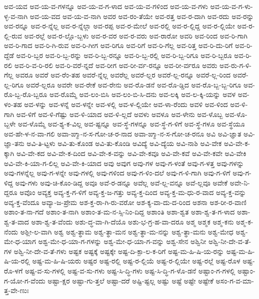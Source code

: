 {ಅವ-ಯವ
ಅವ-ಯ-ವ-ಗಳನ್ನೂ
ಅವ-ಯ-ವ-ಗ-ಳಾದ
ಅವ-ಯ-ವ-ಗಳಿಂದ
ಅವ-ಯ-ವ-ಗಳು
ಅವ-ಯ-ವ-ಗ-ಳು-ಳ್ಳ-ವ-ನಾಗಿ
ಅವ-ಯ-ವದ
ಅವ-ಯ-ವ-ನಾಗಿ
ಅವರ
ಅವ-ರಂ-ತೆಯೇ
ಅವ-ರತ್ತ
ಅವ-ರ-ದಾಗಿ
ಅವ-ರದು
ಅವ-ರನ್ನು
ಅವ-ರನ್ನೂ
ಅವ-ರ-ನ್ನೆಲ್ಲ
ಅವ-ರ-ನ್ನೆಲ್ಲಾ
ಅವ-ರಪ್ಪ
ಅವ-ರ-ಮೇಲೆ
ಅವ-ರಲ್ಲಿ
ಅವ-ರ-ಲ್ಲಿದ್ದ
ಅವ-ರ-ಲ್ಲಿಯೇ
ಅವ-ರ-ಲ್ಲಿ-ರುವ
ಅವ-ರಲ್ಲೆ
ಅವ-ರ-ಲ್ಲೊ-ಬ್ಬಳು
ಅವ-ರ-ವರ
ಅವ-ರ-ವರು
ಅವ-ರಾರೋ
ಅವರಿ
ಅವ-ರಿಂದ
ಅವ-ರಿ-ಗಾಗಿ
ಅವ-ರಿ-ಗಾದ
ಅವ-ರಿ-ಗಿ-ರುವ
ಅವ-ರಿ-ಗೀಗ
ಅವ-ರಿಗೂ
ಅವ-ರಿಗೆ
ಅವ-ರಿ-ಗೆಲ್ಲ
ಅವ-ರಿತ್ತ
ಅವ-ರಿ-ದು-ರಿಗೆ
ಅವ-ರಿ-ದ್ದೆಡೆ
ಅವ-ರಿ-ಬ್ಬರ
ಅವ-ರಿ-ಬ್ಬ-ರನ್ನು
ಅವ-ರಿ-ಬ್ಬ-ರನ್ನೂ
ಅವ-ರಿ-ಬ್ಬ-ರಲ್ಲಿ
ಅವ-ರಿ-ಬ್ಬ-ರಿಗೂ
ಅವ-ರಿ-ಬ್ಬರೂ
ಅವ-ರಿ-ರಲಿ
ಅವ-ರಿ-ವ-ರಿ-ರಲಿ
ಅವ-ರಿ-ವರೆ-ನ್ನದೆ
ಅವ-ರೀಗ
ಅವ-ರೀ-ರ್ವ-ರನ್ನೂ
ಅವ-ರೀ-ರ್ವರೂ
ಅವರು
ಅವ-ರು-ಗ-ಳಿ-ಗೆಲ್ಲ
ಅವರೂ
ಅವರೆ
ಅವ-ರೆಂ-ತಹ
ಅವರೆ-ನ್ನೆಲ್ಲ
ಅವರೆಲ್ಲ
ಅವರೆ-ಲ್ಲರ
ಅವರೆ-ಲ್ಲ-ರನ್ನೂ
ಅವರೆ-ಲ್ಲ-ರಿಂದ
ಅವರೆ-ಲ್ಲ-ರಿಗೂ
ಅವರೆ-ಲ್ಲರೂ
ಅವರೇ
ಅವ-ರೇಕೆ
ಅವ-ರೇನು
ಅವ-ರೊ-ಡನೆ
ಅವ-ರೊ-ಡ್ಡಿದ
ಅವ-ರೊ-ಬ್ಬ-ಬ್ಬ-ರಿಗೂ
ಅವ-ರೊ-ಬ್ಬ-ರೊ-ಬ್ಬರೂ
ಅವ-ರೊಮ್ಮೆ
ಅವ-ಲಂ-ಬಿಸಿ
ಅವ-ಲಂ-ಬಿ-ಸಿ-ದನು
ಅವ-ಲಕ್ಕಿ
ಅವ-ಲ-ಕ್ಕಿ-ಯನ್ನು
ಅವಳ
ಅವ-ಳಂ-ತಹ
ಅವ-ಳನ್ನು
ಅವ-ಳನ್ನೆ
ಅವ-ಳನ್ನೇ
ಅವ-ಳಲ್ಲಿ
ಅವ-ಳ-ಲ್ಲಿಯೇ
ಅವ-ಳಾ-ರೆಂದು
ಅವಳಿ
ಅವ-ಳಿಂದ
ಅವ-ಳಿ-ಗಾಗಿ
ಅವ-ಳಿಗೆ
ಅವ-ಳಿ-ಗೆಷ್ಟು
ಅವ-ಳಿ-ಯಾದ
ಅವ-ಳಿ-ಲ್ಲದೆ
ಅವಳು
ಅವಳೂ
ಅವ-ಳೇನು
ಅವ-ಳೊಬ್ಬ
ಅವ-ಳೊ-ಬ್ಬಳೇ
ಅವ-ಳೊಮ್ಮೆ
ಅವ-ಶ್ಯ-ಕ-ವಿಲ್ಲ
ಅವ-ಷ್ಟನ್ನೂ
ಅವ-ಸ್ಥೆ-ಗಳನ್ನೂ
ಅವ-ಸ್ಥೆ-ಗ-ಳಿಗೆ
ಅವ-ಸ್ಥೆ-ಗಳೂ
ಅವ-ಸ್ಥೆಯೂ
ಅವ-ಹೇ-ಳ-ನ-ವಾ-ಗಲಿ
ಅವಾ-ಙ್ಮಾ-ನ-ಸ-ಗೋ-ಚ-ರ-ನಾದ
ಅವಾ-ಙ್ಮಾ-ನ-ಸ-ಗೋ-ಚ-ರನೂ
ಅವಿ
ಅವಿ-ಜ್ಞಾತ
ಅವಿ-ಜ್ಞಾ-ತನು
ಅವಿ-ತಿ-ಟ್ಟಳು
ಅವಿ-ತು-ಕೊಂಡ
ಅವಿ-ತು-ಕೊಂಡಿ
ಅವಿದ್ಯೆ
ಅವಿ-ದ್ಯೆಯ
ಅವಿ-ನಾಶಿ
ಅವಿ-ವೇಕ
ಅವಿ-ವೇ-ಕ-ಕ್ಕಾಗಿ
ಅವಿ-ವೇ-ಕದ
ಅವಿ-ವೇ-ಕ-ದಿಂದ
ಅವಿ-ವೇ-ಕ-ವನ್ನು
ಅವಿ-ವೇ-ಕವೂ
ಅವಿ-ವೇ-ಕವೆ
ಅವಿ-ವೇ-ಕವೇ
ಅವಿ-ವೇಕಿ
ಅವಿ-ವೇ-ಕಿ-ಯಾ-ಗ-ಲಿಲ್ಲ
ಅವಿ-ವೇ-ಕಿ-ಯಾದ
ಅವು
ಅವುಗ
ಅವು-ಗಳ
ಅವು-ಗ-ಳಂತೆ
ಅವು-ಗ-ಳತ್ತ
ಅವು-ಗಳನ್ನು
ಅವು-ಗಳನ್ನೆಲ್ಲ
ಅವು-ಗ-ಳನ್ನೇ
ಅವು-ಗಳಲ್ಲಿ
ಅವು-ಗಳಿಂದ
ಅವು-ಗ-ಳಿಂ-ದಲೆ
ಅವು-ಗ-ಳಿ-ಗಾಗಿ
ಅವು-ಗ-ಳಿಗೆ
ಅವು-ಗ-ಳಿದ್ದ
ಅವು-ಗಳು
ಅವು-ಚಿ-ಕೊಂ-ಡಿದ್ದ
ಅವೂ
ಅವೆ-ರ-ಡನ್ನೂ
ಅವೆಲ್ಲ
ಅವೆ-ಲ್ಲ-ವನ್ನೂ
ಅವೆ-ಲ್ಲವೂ
ಅವೇಕೆ
ಅವೇ-ನಿ-ದ್ದರೂ
ಅವೊಂ
ಅವ್ಯಕ್ತ
ಅವ್ಯ-ಕ್ತ-ಗ-ಳಿಗೆ
ಅವ್ಯ-ಕ್ತ-ಜ-ಗತ್ತು
ಅವ್ಯ-ಕ್ತ-ದಿಂದ
ಅವ್ಯ-ಕ್ತ-ಮ-ಧು-ರ-ವಾದ
ಅವ್ಯ-ಕ್ತ-ವನ್ನು
ಅವ್ಯ-ಕ್ತ-ವೆಂದೂ
ಅವ್ಯಾ-ಜ-ಪ್ರೇಮ
ಅಶ-ಕ್ತ-ರಾ-ಗಿ-ರು-ವರೋ
ಅಶ-ಕ್ಯ-ವಾ-ದು-ದ-ರಿಂದ
ಅಶನಾ
ಅಶ-ರೀ-ರ-ವಾಣಿ
ಅಶಾಂ-ತ-ನಾ-ಗದೆ
ಅಶಾಂ-ತ-ನಾಗಿ
ಅಶಾಂ-ತ-ಮ-ನ-ಸ್ಸಿ-ನಿಂ-ದಿದ್ದ
ಅಶಾಂತಿ
ಅಶಾ-ಶ್ವತ
ಅಶಾ-ಶ್ವ-ತ-ಗ-ಳಾದ
ಅಶಾ-ಶ್ವ-ತ-ವಾದ
ಅಶಾ-ಶ್ವ-ತ-ವೆಂದು
ಅಶು-ದ್ಧ-ವಾ-ಗಿ-ದೆಯೊ
ಅಶು-ಭ-ಗ್ರ-ಹ-ವಾ-ದರೂ
ಅಶ್ಮ
ಅಶ್ಮಕ
ಅಶ್ಮ-ಕನು
ಅಶ್ಮ-ಕ-ನೆಂದು
ಅಶ್ಲೀ-ಲ-ವಾಗಿ
ಅಶ್ವ
ಅಶ್ವ-ತ್ಥಾಮ
ಅಶ್ವ-ತ್ಥಾ-ಮನ
ಅಶ್ವ-ತ್ಥಾ-ಮ-ನನ್ನು
ಅಶ್ವ-ತ್ಥಾ-ಮನು
ಅಶ್ವ-ಮೇಧ
ಅಶ್ವ-ಮೇ-ಧ-ಯಾಗ
ಅಶ್ವ-ಮೇ-ಧ-ಯಾ-ಗ-ಗಳನ್ನು
ಅಶ್ವ-ಮೇ-ಧ-ಯಾ-ಗ-ವನ್ನು
ಅಶ್ವ-ಸೇನ
ಅಶ್ವಿನೀ
ಅಶ್ವಿ-ನೀ-ದೇ-ವ-ತೆ-ಗಳ
ಅಶ್ವಿ-ನೀ-ದೇ-ವ-ತೆ-ಗಳು
ಅಷ್ಟಕ
ಅಷ್ಟಕ್ಕೆ
ಅಷ್ಟಕ್ಕೇ
ಅಷ್ಟ-ದಿ-ಕ್ಪಾ-ಲ-ಕ-ರಿಗೆ
ಅಷ್ಟ-ಮ-ಹಿ-ಷಿ-ಯ-ರನ್ನು
ಅಷ್ಟ-ಮ-ಹಿ-ಷಿ-ಯ-ರಲ್ಲಿ
ಅಷ್ಟ-ಮ-ಹಿ-ಷಿ-ಯರು
ಅಷ್ಟರ
ಅಷ್ಟ-ರಲ್ಲಿ
ಅಷ್ಟ-ರ-ಲ್ಲಿಯೆ
ಅಷ್ಟ-ರ-ಲ್ಲಿಯೇ
ಅಷ್ಟ-ರಲ್ಲೆ
ಅಷ್ಟ-ರೊಳ
ಅಷ್ಟ-ರೊ-ಳಗೆ
ಅಷ್ಟ-ವ-ಸು-ಗಳಲ್ಲಿ
ಅಷ್ಟ-ವ-ಸು-ಗಳು
ಅಷ್ಟ-ಸಿ-ದ್ಧಿ-ಗಳು
ಅಷ್ಟ-ಸಿ-ದ್ಧಿ-ಗ-ಳೊ-ಡನೆ
ಅಷ್ಟಾಂ-ಗ-ಗಳಲ್ಲಿ
ಅಷ್ಟಾಂ-ಗ-ಯೋ-ಗ-ವೆಂದು
ಅಷ್ಟಾ-ಕ್ಷರ
ಅಷ್ಟಾ-ಗು-ತ್ತಲೆ
ಅಷ್ಟಾ-ದರೆ
ಅಷ್ಟಿ-ಷ್ಟಲ್ಲ
ಅಷ್ಟು
ಅಷ್ಟೆ
ಅಷ್ಟೇ
ಅಷ್ಟೇಕೆ
ಅಸಂ-ಗ-ವ-ಮಾ-ತ್ತ-ವೇ-ಣುಃ
}
